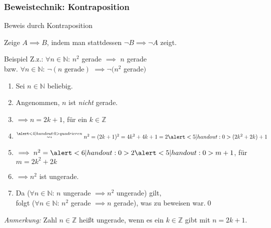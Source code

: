 \subsubsection{Beweistechnik: Kontraposition}
\begin{frame}[fragile]{Beweis durch Kontraposition}
    \begin{alertblock}{Zeige $A\implies B$, indem man stattdessen $\neg B \implies\neg A$ zeigt.}
    \end{alertblock}
    \begin{exampleblock}{Beispiel}
    Z.z.: \alert<7|handout:0>{\alert<1|handout:0>{$\forall n\in\mathbb{N}$:} $n^2$ gerade $\implies$\alert<2|handout:0>{ $n$ gerade}} \\
    \qquad bzw. \alert<1|handout:0>{$\forall n\in\mathbb{N}$:} \alert<2|handout:0>{$\neg(n \text{ gerade})$} $\implies \neg(n^2$ gerade$)$ 
    \begin{enumerate}
        \item\alert<1|handout:0>{Sei $n \in \mathbb{N}$ beliebig.}
        \item\alert<2|handout:0>{Angenommen, $n$ ist \emph{nicht} gerade.}
        \item\alert<3|handout:0>{$\implies n=2k+1$, für ein $k \in \mathbb{Z}$}
        \item $\overset{\alert<4|handout:0>{quadrieren}}{\; \leadsto \;} n^2 = (2k+1)^2 = 4k^2+4k+1 = 2\alert<5|handout:0>{(2k^2+2k)}+1$
        \item $\implies n^2= \alert<6|handout:0>{2\alert<5|handout:0>{m}+1}$, für $m=2k^2+2k$
        \item $\implies n^2$ ist \alert<6|handout:0>{ungerade}.
        \item Da ($\forall n\in\mathbb{N}$: $n$ ungerade $\implies n^2$ ungerade) gilt, \\
        folgt \alert<7|handout:0>{($\forall n\in\mathbb{N}$: $n^2$ gerade $\implies n$ gerade)}, was zu beweisen war.\qed\;
    \end{enumerate}
    \end{exampleblock}
    \footnotesize{\alert<3,6|handout:0>{\emph{Anmerkung:}} Zahl $n\in\mathbb{Z}$ heißt ungerade, wenn es ein $k\in\mathbb{Z}$ gibt mit $n=2k+1$.}
\end{frame}


